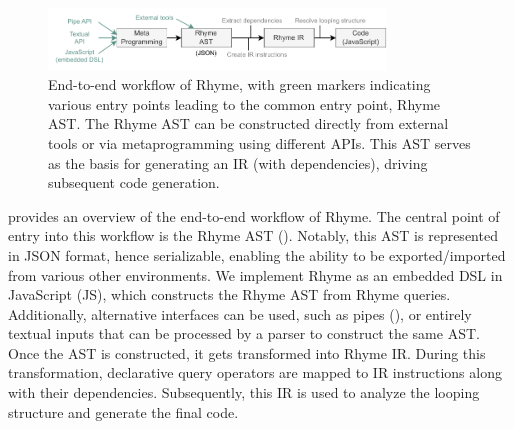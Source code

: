 \documentclass[runningheads]{llncs}
\newcommand{\lang}{Rhyme}
\begin{document}
\begin{figure}[t!]
\centering
\includegraphics[width=0.8\textwidth]{images/intro_fig.pdf}
\caption{
End-to-end workflow of \lang{}, with green markers indicating various entry points
leading to the common entry point, \lang{} AST.
The \lang{} AST can be constructed directly from external tools or via metaprogramming
using different APIs.
This AST serves as the basis for generating an IR (with dependencies), driving
subsequent code generation.
}\label{fig:intro_overview}
\vspace{-7mm}
\end{figure}

 provides an overview of the end-to-end workflow of \lang{}.
The central point of entry into this workflow is the \lang{} AST ().
Notably, this AST is represented in JSON format, hence serializable, enabling the ability
to be exported/imported from various other environments.
We implement \lang{} as an embedded DSL in JavaScript (JS), 
which constructs the \lang{} AST from \lang{} queries.
Additionally, alternative interfaces can be used, such as pipes (),
or entirely textual inputs that can be processed by a parser to construct the same AST.
Once the AST is constructed, it gets transformed into \lang{} IR.
During this transformation, declarative query operators are mapped to IR instructions
along with their dependencies.
Subsequently, this IR is used to analyze the looping structure and generate the final
code.
\end{document}
